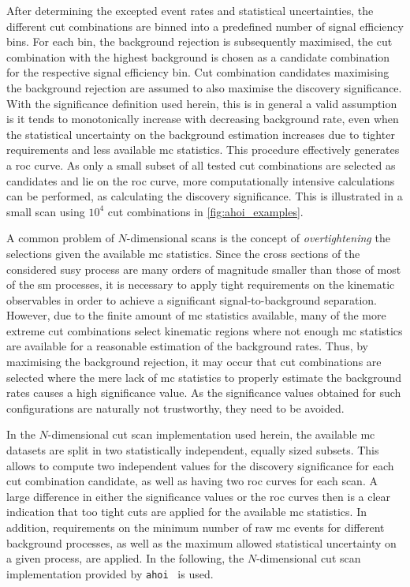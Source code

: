 After determining the excepted event rates and statistical uncertainties, the different cut combinations are binned into a predefined number of signal efficiency bins. For each bin, the background rejection is subsequently maximised, \ie the cut combination with the highest background is chosen as a candidate combination for the respective signal efficiency bin. Cut combination candidates maximising the background rejection are assumed to also maximise the discovery significance. With the significance definition used herein, this is in general a valid assumption is it tends to monotonically increase with decreasing background rate, even when the statistical uncertainty on the background estimation increases due to tighter requirements and less available \gls{mc} statistics. This procedure effectively generates a \gls{roc} curve. As only a small subset of all tested cut combinations are selected as candidates and lie on the \gls{roc} curve, more computationally intensive calculations can be performed, as \eg calculating the discovery significance. This is illustrated in a small scan using $10^4$ cut combinations in \cref{fig:ahoi_examples}. 

A common problem of $N$-dimensional scans is the concept of \textit{overtightening} the selections given the available \gls{mc} statistics. Since the cross sections of the considered \gls{susy} process are many orders of magnitude smaller than those of most of the \gls{sm} processes, it is necessary to apply tight requirements on the kinematic observables in order to achieve a significant signal-to-background separation. However, due to the finite amount of \gls{mc} statistics available, many of the more extreme cut combinations select kinematic regions where not enough \gls{mc} statistics are available for a reasonable estimation of the background rates. Thus, by maximising the background rejection, it may occur that cut combinations are selected where the mere lack of \gls{mc} statistics to properly estimate the background rates causes a high significance value. As the significance values obtained for such configurations are naturally not trustworthy, they need to be avoided. 

In the $N$-dimensional cut scan implementation used herein, the available \gls{mc} datasets are split in two statistically independent, equally sized subsets. This allows to compute two independent values for the discovery significance for each cut combination candidate, as well as having two \gls{roc} curves for each scan. A large difference in either the significance values or the \gls{roc} curves then is a clear indication that too tight cuts are applied for the available \gls{mc} statistics. In addition, requirements on the minimum number of raw \gls{mc} events for different background processes, as well as the maximum allowed statistical uncertainty on a given process, are applied. In the following, the $N$-dimensional cut scan implementation provided by \texttt{ahoi}~\cite{ahoi} is used.

